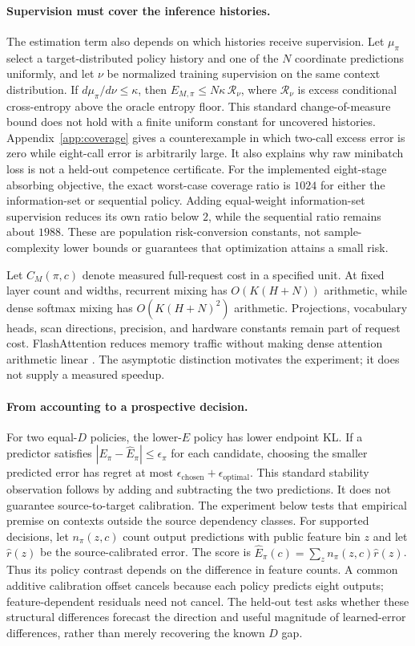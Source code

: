 \documentclass{article}
\begin{document}
\paragraph{Supervision must cover the inference histories.}
The estimation term also depends on which histories receive supervision.
Let $\mu_\pi$ select a target-distributed policy history and one of the $N$
coordinate predictions uniformly, and let $\nu$ be normalized training
supervision on the same context distribution. If
$d\mu_\pi/d\nu\le\kappa$, then
$E_{M,\pi}\le N\kappa\,\mathcal R_\nu$, where $\mathcal R_\nu$ is excess
conditional cross-entropy above the oracle entropy floor. This standard
change-of-measure bound does not hold with a finite uniform constant for
uncovered histories. Appendix~\ref{app:coverage} gives a counterexample in
which two-call excess error is zero while eight-call error is arbitrarily large.
It also explains why raw minibatch loss is not a held-out competence certificate.
For the implemented eight-stage absorbing objective, the exact worst-case
coverage ratio is $1024$ for either the information-set or sequential policy.
Adding equal-weight information-set supervision reduces its own ratio below
$2$, while the sequential ratio remains about $1988$.
These are population risk-conversion constants, not sample-complexity lower
bounds or guarantees that optimization attains a small risk.


Let $C_M(\pi,c)$ denote measured full-request cost in a specified unit. At fixed
layer count and widths, recurrent mixing has $O(K(H+N))$ arithmetic, while
dense softmax mixing has $O(K(H+N)^2)$ arithmetic. Projections, vocabulary heads,
scan directions, precision, and hardware constants remain part of request
cost. FlashAttention reduces memory traffic without making dense attention
arithmetic linear \citep{flashattention}. The asymptotic distinction motivates
the experiment; it does not supply a measured speedup.


\paragraph{From accounting to a prospective decision.}
For two equal-$D$ policies, the lower-$E$ policy has lower endpoint KL. If a
predictor satisfies $|E_\pi-\widehat E_\pi|\le\epsilon_\pi$ for each
candidate, choosing the smaller predicted error has regret at most
$\epsilon_{\mathrm{chosen}}+\epsilon_{\mathrm{optimal}}$. This standard
stability observation follows by adding and subtracting the two predictions.
It does not guarantee source-to-target calibration. The experiment below tests
that empirical premise on contexts outside the source dependency classes.
For supported decisions, let $n_\pi(z,c)$ count output predictions with
public feature bin $z$ and let $\widehat r(z)$ be the source-calibrated error.
The score is $\widehat E_\pi(c)=\sum_z n_\pi(z,c)\widehat r(z)$.
Thus its policy contrast depends on the difference in feature counts. A common
additive calibration offset cancels because each policy predicts eight outputs;
feature-dependent residuals need not cancel. The held-out test asks whether
these structural differences forecast the direction and useful magnitude of
learned-error differences, rather than merely recovering the known $D$ gap.
\end{document}
